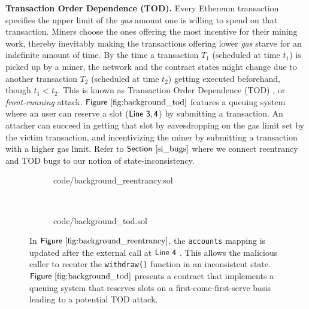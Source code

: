 \documentclass[conference, romanappendices]{tex/IEEEtran}
\theoremstyle{bfnote}
\newcommand{\ethereum}{Ethereum}
\newcommand{\reentrancy}{{reentrancy}\xspace}
\newcommand{\si}{{state-inconsistency}\xspace}
\newcommand{\Line}[1]{\ensuremath{\sf Line~ #1}}
\newcommand{\Fig}[1]{\ensuremath{\sf Figure~\ref{#1}}}
\newcommand{\Sect}[1]{\ensuremath{\sf Section~\ref{#1}}}
\begin{document}
\noindent
\textbf{Transaction Order Dependence (TOD).}
Every \ethereum{} transaction specifies the upper limit of the \textit{gas} amount one is willing to spend on that transaction.
Miners choose the ones offering the most {incentive\EndAccSupp{}} for their mining work, thereby inevitably making the transactions offering lower \textit{gas} starve for an {indefinite\EndAccSupp{}} amount of time.
By the time a transaction $T_1$ (scheduled at time $t_1$) is picked up by a miner, the network and the contract states might change due to another transaction $T_2$ (scheduled at time $t_2$) getting executed {beforehand\EndAccSupp{}}, though $t_1 < t_2$.
This is known as Transaction Order Dependence ({TOD\EndAccSupp{}}) \cite{tod-attack}, or \textit{front-running} attack.
\Fig{fig:background_tod}  features a queuing system where an user can reserve a {slot\EndAccSupp{}} (\Line{3, 4}) by submitting a transaction.
An attacker can succeed in getting that {slot\EndAccSupp{}} by eavesdropping on the gas limit set by the victim transaction, and {incentivizing\EndAccSupp{}} the miner by submitting a transaction with a higher gas limit.
Refer to \Sect{si_bugs} where we connect \reentrancy and {TOD\EndAccSupp{}} bugs to our notion of \si.
\vspace{-2mm}
\begin{figure}[t]
	\centering
	\begin{subfigure}[t]{0.49\columnwidth}
			
			{code/background_reentrancy.sol}
			\vspace{-6.5mm}
			\caption{}
			\label{fig:background_reentrancy}
	\end{subfigure}\hfill
	~ 
	\begin{subfigure}[t]{0.45\columnwidth}
		\centering
			
		{code/background_tod.sol}
		\vspace{-2mm}
		\caption{}
		\label{fig:background_tod}
		
	\end{subfigure}
	\vspace{-2.5mm}
	\caption{\small In \Fig{fig:background_reentrancy}, the \texttt{accounts} mapping is updated after the external call at \Line{4} .
	This allows the malicious caller to reenter the \texttt{withdraw()} function in an inconsistent state. 
	\Fig{fig:background_tod} presents a contract that implements a queuing system that reserves slots on a  first-come-first-serve basis leading to a potential TOD attack.}
	\vspace{-6mm}
\end{figure}
\end{document}
